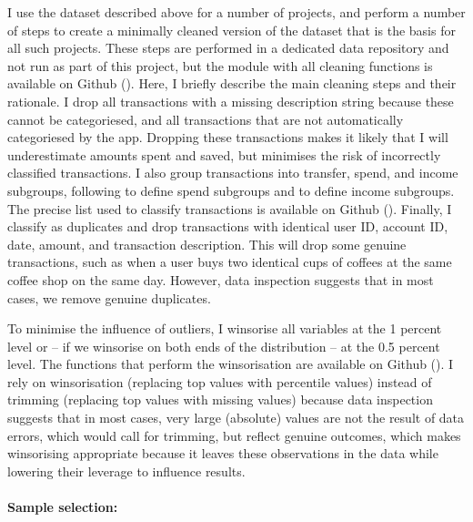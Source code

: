 I use the dataset described above for a number of projects, and perform a
number of steps to create a minimally cleaned version of the dataset that is
the basis for all such projects. These steps are performed in a dedicated data
repository and not run as part of this project, but the module with all
cleaning functions is available on Github 
(\href{https:/egithub.com/fabiangunzinger/mdb_eval/blob/f51e49c95c5884d2dc417be23921a8acd85aec9d/src/data/clean.py}{\faGithub}).
Here, I briefly describe the main cleaning steps and their rationale. I drop
all transactions with a missing description string because these cannot be
categoriesed, and all transactions that are not automatically categoriesed by
the app. Dropping these transactions makes it likely that I will underestimate
amounts spent and saved, but minimises the risk of incorrectly classified
transactions. I also group transactions into transfer, spend, and income
subgroups, following \citet{muggleton2020evidence} to define spend subgroups
and \citet{hacioglu2021distributional} to define income subgroups. The precise
list used to classify transactions is available on Github
(\href{https://github.com/fabiangunzinger/mdb_eval/blob/92af366d4c4052cc7a7f78a6178086de8ecdfb75/src/data/txn_classifications.py}{\faGithub}).
Finally, I classify as duplicates and drop transactions with identical user ID,
account ID, date, amount, and transaction description. This will drop some
genuine transactions, such as when a user buys two identical cups of coffees at
the same coffee shop on the same day. However, data inspection suggests that in
most cases, we remove genuine duplicates.

To minimise the influence of outliers, I winsorise all variables at the 1
percent level or -- if we winsorise on both ends of the distribution -- at the
0.5 percent level. The functions that perform the winsorisation are available
on Github
(\href{https://github.com/fabiangunzinger/mdb_eval/blob/d04fe186bb5cca884af2b7c1c7ad429674ef701d/src/data/transformers.py}{\faGithub}).
I rely on winsorisation (replacing top values with percentile values) instead
of trimming (replacing top values with missing values) because data inspection
suggests that in most cases, very large (absolute) values are not the result of
data errors, which would call for trimming, but reflect genuine outcomes,
which makes winsorising appropriate because it leaves these observations in the
data while lowering their leverage to influence results.


\paragraph{Sample selection:}%
\label{par:sample_selection_}

